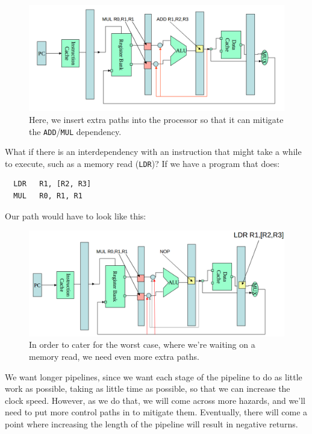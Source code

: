\begin{figure}[ht]
  \centering
  \includegraphics[width=\textwidth]{images/extra-paths}
  \caption{Here, we insert extra paths into the processor so that it can
  mitigate the \texttt{ADD}/\texttt{MUL} dependency.}
  \label{extra-paths}
\end{figure}

What if there is an interdependency with an instruction that might take a while
to execute, such as a memory read (\texttt{LDR})? If we have a program that
does:

\begin{verbatim}
  LDR   R1, [R2, R3]
  MUL   R0, R1, R1
\end{verbatim}

Our path would have to look like this:

\begin{figure}[ht]
  \centering
  \includegraphics[width=\textwidth]{images/more-extra-paths}
  \caption{In order to cater for the worst case, where we're waiting on a memory
  read, we need even more extra paths.}
  \label{more-extra-paths}
\end{figure}

We want longer pipelines, since we want each stage of the pipeline to do as
little work as possible, taking as little time as possible, so that we can
increase the clock speed. However, as we do that, we will come across more
hazards, and we'll need to put more control paths in to mitigate them.
Eventually, there will come a point where increasing the length of the pipeline
will result in negative returns.

